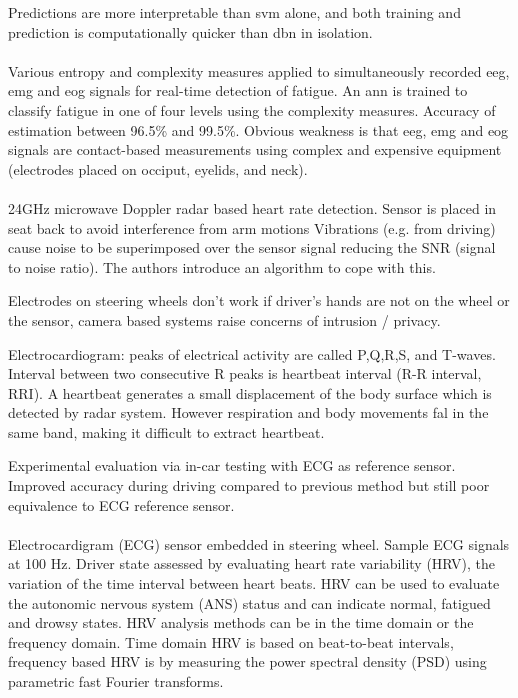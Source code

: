 \documentclass[11pt, parskip=half*,twoside=false]{scrbook}
\begin{document}
Predictions are more interpretable than \gls{svm} alone, and both training and prediction is computationally quicker than \gls{dbn} in isolation. 
 
\paragraph{\citet{zhangAutomatedDetectionDriver2014}} Various entropy and complexity measures applied to simultaneously recorded \gls{eeg}, \gls{emg} and \gls{eog} signals for real-time detection of fatigue. An \gls{ann} is trained to classify fatigue in one of four levels using the complexity measures. Accuracy of estimation between 96.5\% and 99.5\%. Obvious weakness is that \gls{eeg}, \gls{emg} and \gls{eog} signals are contact-based measurements using complex and expensive equipment (electrodes placed on occiput, eyelids, and neck). 

\paragraph{\citet{tsuchiyaHeartbeatDetectionTechnology2020}} 24GHz microwave Doppler radar based heart rate detection. Sensor is placed in seat back to avoid interference from arm motions  Vibrations (e.g. from driving) cause noise to be superimposed over the sensor signal reducing the SNR (signal to noise ratio). The authors introduce an algorithm to cope with this. 

Electrodes on steering wheels don't work if driver's hands are not on the wheel or the sensor, camera based systems raise concerns of intrusion / privacy. 

Electrocardiogram: peaks of electrical activity are called P,Q,R,S, and T-waves. Interval between two consecutive R peaks is heartbeat interval (R-R interval, RRI). A heartbeat generates a small displacement of the body surface which is detected by radar system. However  respiration and body movements fal in the same band, making it difficult to extract heartbeat.

Experimental evaluation via in-car testing with ECG as reference sensor. Improved accuracy during driving compared to previous method but still poor equivalence to ECG reference sensor.

\paragraph{\citet{jungDriverFatigueDrowsiness2014}} Electrocardigram (ECG) sensor embedded in steering wheel. Sample ECG signals at 100 Hz. Driver state assessed by evaluating heart rate variability (HRV), the variation of the time interval between heart beats. HRV can be used to evaluate the autonomic nervous system (ANS) status and can indicate normal, fatigued and drowsy states. HRV analysis methods can be in the time domain or the frequency domain. Time domain HRV is based on beat-to-beat intervals, frequency based HRV is by measuring the power spectral density (PSD) using parametric fast Fourier transforms.
	
\end{document}
